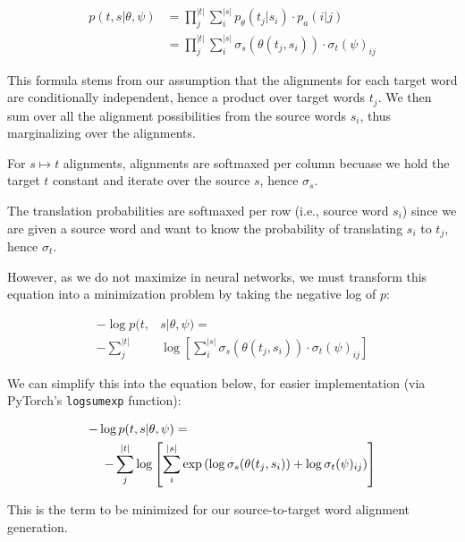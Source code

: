 \documentclass[twoside,twocolumn]{article}
\begin{document}
\begin{equation}
  \begin{split}
  p(t, s | \theta, \psi)
    &= \prod_j^{|t|} \sum_i^{|s|} p_\theta(t_j| s_i) \cdot p_a(i|j) \\
    &= \prod_j^{|t|} \sum_i^{|s|} \sigma_s(\theta(t_j, s_i)) \cdot \sigma_t(\psi)_{ij}
  \end{split}{}
\end{equation}

This formula stems from our assumption that the alignments for each
target word are conditionally independent, hence a product over target
words $t_j$. We then sum over all the alignment possibilities from the source
words $s_i$, thus marginalizing over the alignments.

For $s \mapsto t$ alignments, alignments are softmaxed per column becuase we hold the target $t$ constant and iterate over the source $s$, hence $\sigma_s$.

The translation probabilities are softmaxed per row (i.e., source word $s_i$) since we are given a source word
and want to know the probability of translating $s_i$ to $t_j$, hence $\sigma_t$.

However, as we do not maximize in neural networks, we must transform this
equation into a minimization problem by taking the negative log of $p$:

\begin{equation}
  \begin{split}
  -\log p(t, & s | \theta, \psi) = \\
  - \sum_j^{|t|}
    & \log \left[ \sum_i^{|s|} \sigma_s \left( \theta(t_j, s_i) \right) \cdot
      \sigma_t(\psi)_{ij} \right]
\end{split}
\end{equation}

We can simplify this into the equation below, for easier implementation
(via PyTorch's \texttt{logsumexp} function):

\begin{equation}
  \centering
  \begin{split}
  -\log  p(t & , s | \theta, \psi) = \\
  - \sum_j^{|t|} & \log \left[ \sum_i^{|s|} \exp
      \left( \log \sigma_s(\theta(t_j, s_i)) + \log \sigma_t(\psi)_{ij} \right)
    \right]
\end{split}
\end{equation}

This is the term to be minimized for our source-to-target word alignment
generation.
\end{document}
